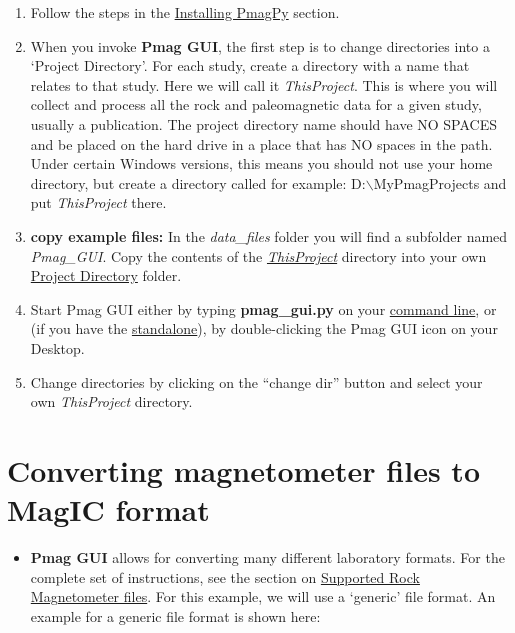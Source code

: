 \documentclass[11pt]{book}
\begin{document}
{\begin{enumerate}
\item Follow the steps in the \href{#quick_start}{Installing PmagPy} section.


\item  When you invoke {\bf Pmag GUI}, the first step is to change directories into a  `Project Directory'. For each study, create a directory with a name that relates to that study. Here we will call it {\it ThisProject}.  This is where you will collect and process all the rock and paleomagnetic data for a given study, usually a publication. The project directory name should have NO SPACES and be placed on the hard drive in a place that has NO spaces in the path. Under certain Windows versions, this means you should not use your home directory, but create a directory called for example: D:$\backslash$MyPmagProjects and put {\it ThisProject} there.
%
%
%


 \item \textbf{copy example files:}  In the {\it data\_files } folder you will find a subfolder named {\it Pmag\_GUI}. Copy the contents of the  \href{#Project_Directory}{\it ThisProject} directory  into  your  own \href{#Project_Directory}{Project Directory} folder.
 \item Start Pmag GUI either by typing {\bf pmag\_gui.py} on your \href{#command_line}{command line}, or (if you have the \href{#standalone}{standalone}), by double-clicking the Pmag GUI icon on your Desktop.
 \item Change directories by clicking  on the ``change dir'' button and select your own {\it ThisProject} directory.
 \end{enumerate}


\section{Converting magnetometer files to MagIC format}
\begin{itemize}
\item {\bf Pmag GUI} allows for converting many different laboratory formats.  For the complete set of instructions, see the section on \href{#magnetometer_files}{Supported Rock Magnetometer files}.   For this example, we will use a `generic' file format.
An example for a generic file format is shown here:


\end{itemize}}
\end{document}
